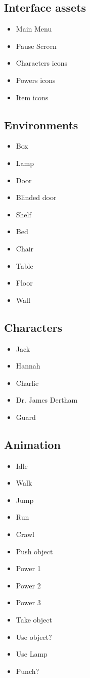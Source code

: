 \subsection{Interface assets}
\begin{itemize}  
\item Main Menu
\item Pause Screen
\item Characters icons
\item Powers icons
\item Item icons
\end{itemize}


\subsection{Environments}
\begin{itemize}  
\item Box
\item Lamp
\item Door
\item Blinded door
\item Shelf
\item Bed
\item Chair
\item Table
\item Floor
\item Wall
\end{itemize}
        
\subsection{Characters}
\begin{itemize}  
\item Jack
\item Hannah
\item Charlie
\item Dr. James Dertham
\item Guard
\end{itemize}

\subsection{Animation}
\begin{itemize}  
\item Idle
\item Walk
\item Jump
\item Run
\item Crawl
\item Push object
\item Power 1
\item Power 2
\item Power 3
\item Take object
\item Use object?
\item Use Lamp
\item Punch?
\end{itemize}

